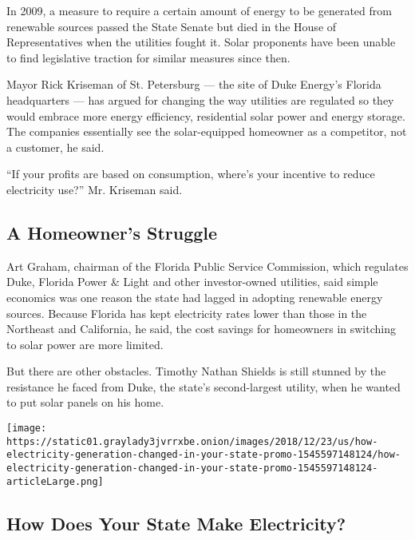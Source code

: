 In 2009, a measure to require a certain amount of energy to be generated
from renewable sources passed the State Senate but died in the House of
Representatives when the utilities fought it. Solar proponents have been
unable to find legislative traction for similar measures since then.

Mayor Rick Kriseman of St. Petersburg --- the site of Duke Energy's
Florida headquarters --- has argued for changing the way utilities are
regulated so they would embrace more energy efficiency, residential
solar power and energy storage. The companies essentially see the
solar-equipped homeowner as a competitor, not a customer, he said.

``If your profits are based on consumption, where's your incentive to
reduce electricity use?'' Mr. Kriseman said.

\hypertarget{a-homeowners-struggle}{%
\subsection{A Homeowner's Struggle}\label{a-homeowners-struggle}}

Art Graham, chairman of the Florida Public Service Commission, which
regulates Duke, Florida Power \& Light and other investor-owned
utilities, said simple economics was one reason the state had lagged in
adopting renewable energy sources. Because Florida has kept electricity
rates lower than those in the Northeast and California, he said, the
cost savings for homeowners in switching to solar power are more
limited.

But there are other obstacles. Timothy Nathan Shields is still stunned
by the resistance he faced from Duke, the state's second-largest
utility, when he wanted to put solar panels on his home.

\href{https://www.nytimes3xbfgragh.onion/interactive/2018/12/24/climate/how-electricity-generation-changed-in-your-state.html}{}

\texttt{[image: https://static01.graylady3jvrrxbe.onion/images/2018/12/23/us/how-electricity-generation-changed-in-your-state-promo-1545597148124/how-electricity-generation-changed-in-your-state-promo-1545597148124-articleLarge.png]}

\hypertarget{how-does-your-state-make-electricity}{%
\subsection{How Does Your State Make
Electricity?}\label{how-does-your-state-make-electricity}}

